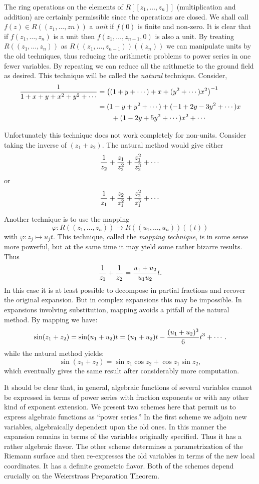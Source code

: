 The ring operations on the elements of $R[[z_1, \ldots, z_n]]$
(multiplication and addition) are
certainly permissible since the operations are closed.
We shall call $f(z) \in R((z_1, \ldots, z{n}))$ a {\em unit} if
$f(0)$ is finite and non-zero.  It is clear that if
$f(z_1, \ldots , z_n)$ is a unit then $f(z_1, \ldots , z_{n-1},0)$
is also a unit.  By treating $R((z_1, \ldots, z_n))$ as
$R((z_1, \ldots , z_{n-1})) ((z_n))$ we can manipulate units
by the old techniques, thus reducing the arithmetic problems
to power series in one fewer variables.  By repeating we
can reduce all the arithmetic to the ground field as desired.
This technique will be called the {\em natural} technique.
Consider, 
\[
\begin{aligned}
  1 \over 1 + x + y + x^2 + y^2 + \cdots
    &= \left((1 + y + \cdots) + x + (y^2 + \cdots) x^2 \right)^{-1}\\
    &= (1 - y + y^2 + \cdots) + (-1 + 2 y -3 y^2 + \cdots) x \\
    & \qquad  + (1 - 2 y + 5y^2 + \cdots) x^2 + \cdots
\end{aligned}
\]

Unfortunately this technique does not work completely
for non-units.  Consider taking the inverse of $(z_1 + z_2)$.
The natural method would give either 
\[
{1 \over z_2} + {z_1 \over z_2^2} + {z_1^2 \over z_2^3} + \cdots
\]
or 
\[
{1 \over z_1} + {z_2 \over z_1^2} + {z_2^2 \over z_1^3} + \cdots
\]

Another technique is to use the mapping 
\[
\varphi : R((z_1, \ldots, z_n)) \longrightarrow
R((u_1, \ldots, u_n)) ((t))
\]
with $\varphi : z_j \mapsto  u_j t$.
This technique, called the {\em mapping technique\/}, is in some sense
more powerful, but at the same time it may yield some rather 
bizarre results.  Thus 
\[
{1 \over z_1} + {1 \over z_2} = {u_1 + u_2 \over u_1 u_2} t.
\]
In this case it is at least possible to decompose in partial
fractions and recover the original expansion. But in complex
expansions this may be impossible.
In expansions involving
substitution, mapping avoids a pitfall of the natural method.
By mapping we have: 
\[
\sin (z_1 + z_2)  =  \sin (u_1 + u_2) t
  =  (u_1 + u_2) t - {(u_1 + u_2)^3 \over 6} t^3 + \cdots.
\]
while the natural method yields: 
\[
\sin (z_1 + z_2)  =  \sin z_1 \cos z_2 + \cos z_1 \sin z_2,
\]
which eventually gives the same result after considerably more
computation.

It should be clear that, in general, algebraic
functions of several variables cannot be expressed in terms
of power series with fraction exponents or
with any other kind of exponent
extension.  We present two schemes here that permit us to express
algebraic functions as ``power series.''  In the first scheme we
adjoin new variables, algebraically dependent upon the old
ones.  In this manner the expansion remains in terms of the
variables originally specified.
Thus it has a rather algebraic flavor.  The other
scheme determines a parametrization of the Riemann surface
and then re-expresses the old variables in terms of the
new local coordinates.  It has a definite geometric flavor.
Both of the schemes depend crucially on the Weierstrass
Preparation Theorem.

